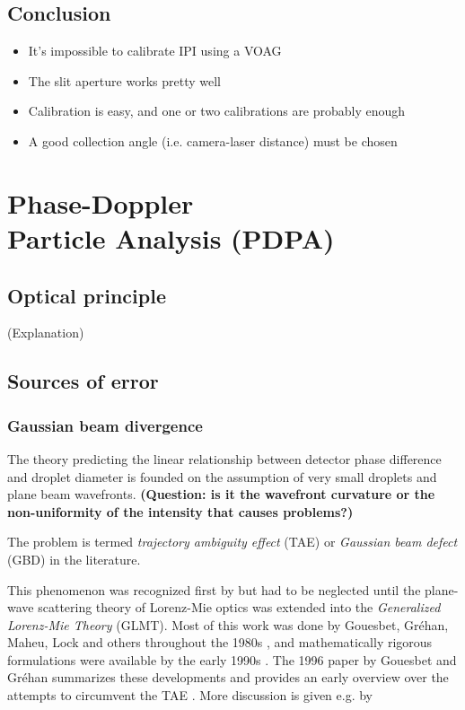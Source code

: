 \documentclass[10pt]{book}
\begin{document}
\section{Conclusion}
\begin{itemize}
    \item It's impossible to calibrate IPI using a VOAG
    \item The slit aperture works pretty well
    \item Calibration is easy, and one or two calibrations are probably enough
    \item A good collection angle (i.e. camera-laser distance) must be chosen
\end{itemize}

\chapter{Phase-Doppler\\Particle Analysis (PDPA)}

\section{Optical principle}
(Explanation)

\section{Sources of error}
\subsection{Gaussian beam divergence}
The theory predicting the linear relationship between detector phase difference
and droplet diameter is founded on the assumption of very small droplets and
plane beam wavefronts. \textbf{(Question: is it the wavefront curvature or the
non-uniformity of the intensity that causes problems?)}

The problem is termed \emph{trajectory ambiguity effect} (TAE) or \emph{Gaussian
beam defect} (GBD) in the literature.

This phenomenon was recognized first by \citet{Saffman86} but had to be neglected until
the plane-wave scattering theory of Lorenz-Mie optics was extended into
the \emph{Generalized Lorenz-Mie Theory} (GLMT). Most of this work was
done by Gouesbet, Gréhan, Maheu, Lock and others throughout the 1980s
\cite{Grehan80, Gouesbet82, Gouesbet88, Maheu88}, and mathematically
rigorous formulations were available by the early 1990s \cite{Lock94,
Gouesbet94}. The 1996 paper by Gouesbet and Gréhan summarizes these developments
and provides an early overview over the attempts to circumvent the TAE
\cite{Gouesbet96}. More discussion is given e.g. by 
\end{document}
